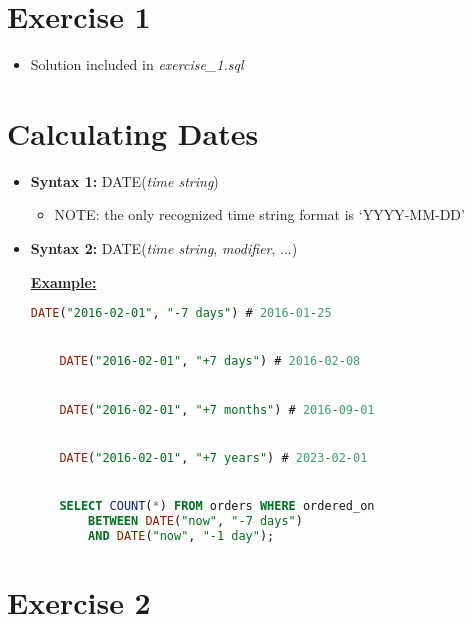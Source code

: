 \documentclass[12pt]{article}
\begin{document}
\bigskip

\section{Exercise 1}

\bigskip

\begin{itemize}
    \item Solution included in \textit{exercise\_1.sql}
\end{itemize}

\bigskip

\section{Calculating Dates}

\bigskip

\begin{itemize}
    \item \textbf{Syntax 1:} DATE(\textit{time string})
    \begin{itemize}
        \item NOTE: the only recognized time string format is `YYYY-MM-DD'
    \end{itemize}
    \item \textbf{Syntax 2:} DATE(\textit{time string}, \textit{modifier}, ...)

    \bigskip

    \underline{\textbf{Example:}}

    \bigskip

    \begin{lstlisting}[language=SQL]
    DATE("2016-02-01", "-7 days") # 2016-01-25


    DATE("2016-02-01", "+7 days") # 2016-02-08


    DATE("2016-02-01", "+7 months") # 2016-09-01


    DATE("2016-02-01", "+7 years") # 2023-02-01


    SELECT COUNT(*) FROM orders WHERE ordered_on
        BETWEEN DATE("now", "-7 days")
        AND DATE("now", "-1 day");
    \end{lstlisting}

\end{itemize}

\bigskip

\section{Exercise 2}
\end{document}
